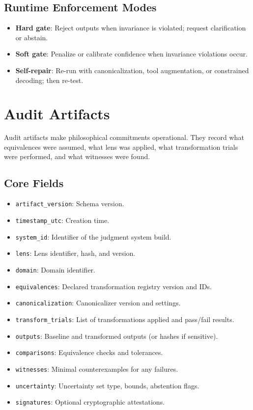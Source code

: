 \documentclass[12pt,letterpaper]{article}
\theoremstyle{definition}
\theoremstyle{plain}
\begin{document}
\subsection{Runtime Enforcement Modes}

\begin{itemize}
    \item \textbf{Hard gate}: Reject outputs when invariance is violated; request clarification or abstain.
    \item \textbf{Soft gate}: Penalize or calibrate confidence when invariance violations occur.
    \item \textbf{Self-repair}: Re-run with canonicalization, tool augmentation, or constrained decoding; then re-test.
\end{itemize}


\section{Audit Artifacts}
\label{sec:audit}

Audit artifacts make philosophical commitments operational. They record what equivalences were assumed, what lens was applied, what transformation trials were performed, and what witnesses were found.

\subsection{Core Fields}

\begin{itemize}
    \item \texttt{artifact\_version}: Schema version.
    \item \texttt{timestamp\_utc}: Creation time.
    \item \texttt{system\_id}: Identifier of the judgment system build.
    \item \texttt{lens}: Lens identifier, hash, and version.
    \item \texttt{domain}: Domain identifier.
    \item \texttt{equivalences}: Declared transformation registry version and IDs.
    \item \texttt{canonicalization}: Canonicalizer version and settings.
    \item \texttt{transform\_trials}: List of transformations applied and pass/fail results.
    \item \texttt{outputs}: Baseline and transformed outputs (or hashes if sensitive).
    \item \texttt{comparisons}: Equivalence checks and tolerances.
    \item \texttt{witnesses}: Minimal counterexamples for any failures.
    \item \texttt{uncertainty}: Uncertainty set type, bounds, abstention flags.
    \item \texttt{signatures}: Optional cryptographic attestations.
\end{itemize}
\end{document}
